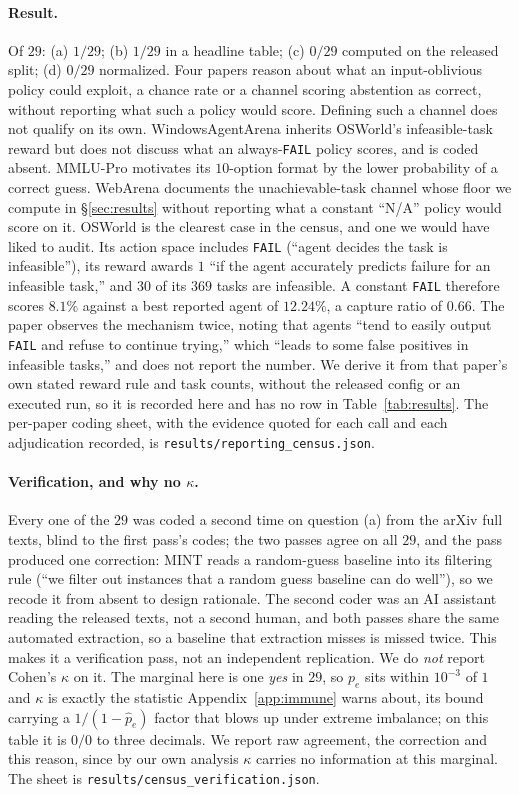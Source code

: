 \documentclass{article}
\theoremstyle{plain}
\theoremstyle{definition}
\begin{document}
\paragraph{Result.} Of $29$: (a) $1/29$; (b) $1/29$ in a headline table; (c) $0/29$ computed on the released split; (d) $0/29$ normalized. Four papers reason about what an input-oblivious policy could exploit, a chance rate or a channel scoring abstention as correct, without reporting what such a policy would score. Defining such a channel does not qualify on its own. WindowsAgentArena inherits OSWorld's infeasible-task reward but does not discuss what an always-\texttt{FAIL} policy scores, and is coded absent. MMLU-Pro motivates its $10$-option format by the lower probability of a correct guess. WebArena documents the unachievable-task channel whose floor we compute in \S\ref{sec:results} without reporting what a constant ``N/A'' policy would score on it. OSWorld is the clearest case in the census, and one we would have liked to audit. Its action space includes \texttt{FAIL} (``agent decides the task is infeasible''), its reward awards $1$ ``if the agent accurately predicts failure for an infeasible task,'' and $30$ of its $369$ tasks are infeasible. A constant \texttt{FAIL} therefore scores $8.1\%$ against a best reported agent of $12.24\%$, a capture ratio of $0.66$. The paper observes the mechanism twice, noting that agents ``tend to easily output \texttt{FAIL} and refuse to continue trying,'' which ``leads to some false positives in infeasible tasks,'' and does not report the number. We derive it from that paper's own stated reward rule and task counts, without the released config or an executed run, so it is recorded here and has no row in Table~\ref{tab:results}. The per-paper coding sheet, with the evidence quoted for each call and each adjudication recorded, is \texttt{results/reporting\_census.json}.

\paragraph{Verification, and why no $\kappa$.} Every one of the $29$ was coded a second time on question (a) from the arXiv full texts, blind to the first pass's codes; the two passes agree on all $29$, and the pass produced one correction: MINT reads a random-guess baseline into its filtering rule (``we filter out instances that a random guess baseline can do well''), so we recode it from absent to design rationale. The second coder was an AI assistant reading the released texts, not a second human, and both passes share the same automated extraction, so a baseline that extraction misses is missed twice. This makes it a verification pass, not an independent replication. We do \emph{not} report Cohen's $\kappa$ on it. The marginal here is one \emph{yes} in $29$, so $p_e$ sits within $10^{-3}$ of $1$ and $\kappa$ is exactly the statistic Appendix~\ref{app:immune} warns about, its bound carrying a $1/(1-\hat{p}_e)$ factor that blows up under extreme imbalance; on this table it is $0/0$ to three decimals. We report raw agreement, the correction and this reason, since by our own analysis $\kappa$ carries no information at this marginal. The sheet is \texttt{results/census\_verification.json}.
\end{document}

